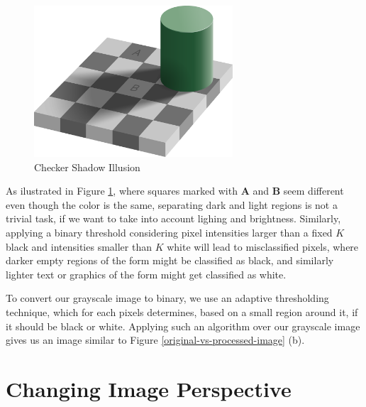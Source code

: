 \documentclass[11pt, a4paper]{report}
\begin{document}
 \begin{figure}[!h]
  \centering
  \includegraphics[width=20em]{images/other/Checker_shadow_illusion.svg.png}
  \caption{Checker Shadow Illusion\cite{checker-illusion}}
  \label{checker-illusion}
\end{figure}

As ilustrated in Figure \ref{checker-illusion}, where squares marked with \textbf{A} and \textbf{B} seem different even though the color is the same, separating dark and light regions is not a trivial task, if we want to take into account lighing and brightness. Similarly, applying a binary threshold considering pixel intensities larger than a fixed $K$ black and intensities smaller than $K$ white will lead to misclassified pixels, where darker empty regions of the form might be classified as black, and similarly lighter text or graphics of the form might get classified as white.

To convert our grayscale image to binary, we use an adaptive thresholding technique\cite{opencv-image-threshold}, which for each pixels determines, based on a small region around it, if it should be black or white. Applying such an algorithm over our grayscale image gives us an image similar to Figure \ref{original-vs-processed-image} (b).



\section{Changing Image Perspective}

\end{document}
